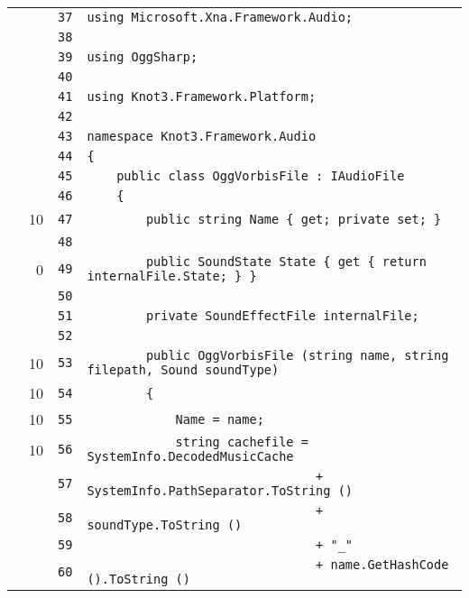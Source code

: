 \documentclass[a4paper,10pt]{article}
\begin{document}
\begin{longtable}[l]{lrrl}
\cellcolor{gray} &  & \verb~37~ & \verb~using Microsoft.Xna.Framework.Audio;~\\
\cellcolor{gray} &  & \verb~38~ & \verb~~\\
\cellcolor{gray} &  & \verb~39~ & \verb~using OggSharp;~\\
\cellcolor{gray} &  & \verb~40~ & \verb~~\\
\cellcolor{gray} &  & \verb~41~ & \verb~using Knot3.Framework.Platform;~\\
\cellcolor{gray} &  & \verb~42~ & \verb~~\\
\cellcolor{gray} &  & \verb~43~ & \verb~namespace Knot3.Framework.Audio~\\
\cellcolor{gray} &  & \verb~44~ & \verb~{~\\
\cellcolor{gray} &  & \verb~45~ & \verb~    public class OggVorbisFile : IAudioFile~\\
\cellcolor{gray} &  & \verb~46~ & \verb~    {~\\
\cellcolor{green} & 10 & \verb~47~ & \verb~        public string Name { get; private set; }~\\
\cellcolor{gray} &  & \verb~48~ & \verb~~\\
\cellcolor{red} & 0 & \verb~49~ & \verb~        public SoundState State { get { return internalFile.State; } }~\\
\cellcolor{gray} &  & \verb~50~ & \verb~~\\
\cellcolor{gray} &  & \verb~51~ & \verb~        private SoundEffectFile internalFile;~\\
\cellcolor{gray} &  & \verb~52~ & \verb~~\\
\cellcolor{green} & 10 & \verb~53~ & \verb~        public OggVorbisFile (string name, string filepath, Sound soundType)~\\
\cellcolor{green} & 10 & \verb~54~ & \verb~        {~\\
\cellcolor{green} & 10 & \verb~55~ & \verb~            Name = name;~\\
\cellcolor{green} & 10 & \verb~56~ & \verb~            string cachefile = SystemInfo.DecodedMusicCache~\\
\cellcolor{gray} &  & \verb~57~ & \verb~                               + SystemInfo.PathSeparator.ToString ()~\\
\cellcolor{gray} &  & \verb~58~ & \verb~                               + soundType.ToString ()~\\
\cellcolor{gray} &  & \verb~59~ & \verb~                               + "_"~\\
\cellcolor{gray} &  & \verb~60~ & \verb~                               + name.GetHashCode ().ToString ()~\\

\end{longtable}
\end{document}
